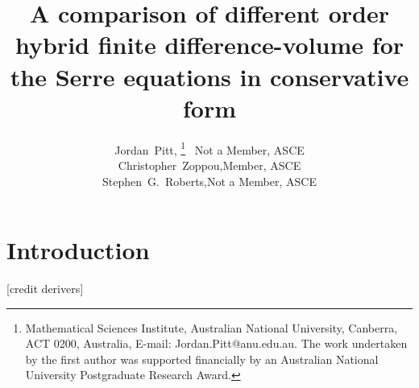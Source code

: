 \documentclass[SingleSpace,12pt]{Serre_ASCE}
\begin{document}
\title{A comparison of different order hybrid finite difference-volume for the Serre equations in conservative form}

\author{
Jordan~Pitt,%
\thanks{Mathematical Sciences Institute, Australian National University, Canberra, ACT 0200, Australia, E-mail: Jordan.Pitt@anu.edu.au. The work undertaken by the first author was supported financially by an Australian National University Postgraduate Research Award.}
\ Not a Member, ASCE
\\
Christopher~Zoppou,\footnotemark[1] Member, ASCE%
%
\\
Stephen~G.~Roberts,\footnotemark[1] Not a Member, ASCE
}

\maketitle

\begin{abstract}

\end{abstract}


\linenumbers

\section{Introduction} \label{intro} 
[credit derivers]


\end{document}
